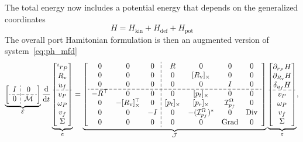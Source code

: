 The total energy now includes a potential energy that depends on the generalized coordinates
\begin{equation*}
H = H_{\text{kin}} + H_{\text{def}} + H_{\text{pot}}
\end{equation*}
The overall port Hamitonian formulation is then an augmented version of system~\eqref{eq:ph_mfd}
\begin{equation}
\label{eq:ph_mfd_all}
\setlength{\dashlinegap}{2pt}
\underbrace{
	{\left[ \begin{array}{c:c}
		I & 0 \\
		\hdashline
		0 & \mathcal{M} \\
		\end{array} \right]}
}_{\mathcal{E}}
\diff{}{t}
\underbrace{\begin{bmatrix}
^i r_P \\ R_{\text{v}} \\ u_f \\\hdashline  v_P \\ \omega_P  \\ v_f  \\ \Sigma \\
\end{bmatrix}}_{e} = 
\underbrace{
	{\left[ \begin{array}{ccc:cccc}
		0 & 0 & 0 &  R & 0 & 0 & 0 \\
		0 & 0 & 0 & 0 & \crmat{R_{\text{v}}} & 0 & 0 \\
		0 & 0 & 0 & 0 & 0 & I & 0 \\ 
		\hdashline 
		-R^\top & 0 & 0 & 0 & \crmat{p_t} & 0 & 0 \\
		0 & -\crmat{R_{\text{v}}}^\top & 0 & \crmat{p_t} & \crmat{p_r} & \mathcal{I}_{p_f}^\Omega & 0 \\
		0 & 0 & -I & 0 & -(\mathcal{I}_{p_f}^\Omega)^* & 0 & \Div \\
		0 & 0 & 0 & 0 & 0 & \Grad & 0 \\
		\end{array} \right]}
	}_{\mathcal{J}}
\underbrace{\begin{bmatrix}
\partial_{r_P}H \\ \partial_{R_\text{v}}H \\ \delta_{u_f} H \\\hdashline  v_P \\ \omega_P  \\ v_f  \\ \Sigma \\
\end{bmatrix}}_{z},
\end{equation} 
